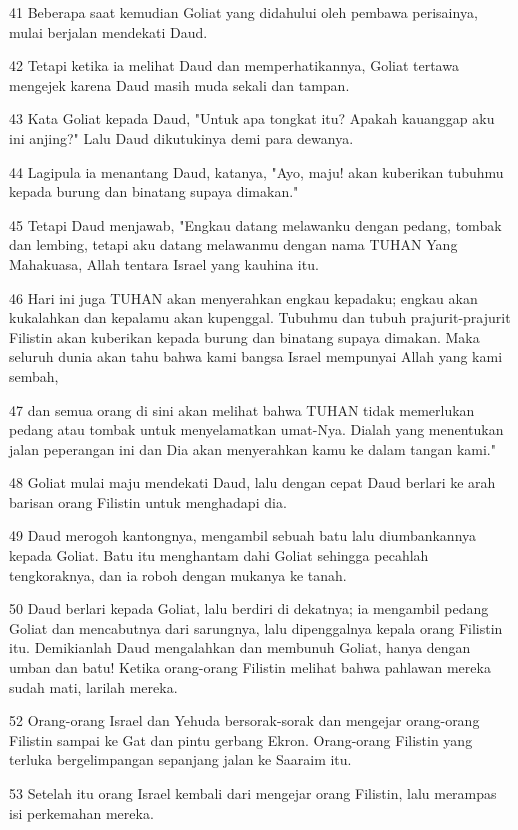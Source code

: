 \par 41 Beberapa saat kemudian Goliat yang didahului oleh pembawa perisainya, mulai berjalan mendekati Daud.
\par 42 Tetapi ketika ia melihat Daud dan memperhatikannya, Goliat tertawa mengejek karena Daud masih muda sekali dan tampan.
\par 43 Kata Goliat kepada Daud, "Untuk apa tongkat itu? Apakah kauanggap aku ini anjing?" Lalu Daud dikutukinya demi para dewanya.
\par 44 Lagipula ia menantang Daud, katanya, "Ayo, maju! akan kuberikan tubuhmu kepada burung dan binatang supaya dimakan."
\par 45 Tetapi Daud menjawab, "Engkau datang melawanku dengan pedang, tombak dan lembing, tetapi aku datang melawanmu dengan nama TUHAN Yang Mahakuasa, Allah tentara Israel yang kauhina itu.
\par 46 Hari ini juga TUHAN akan menyerahkan engkau kepadaku; engkau akan kukalahkan dan kepalamu akan kupenggal. Tubuhmu dan tubuh prajurit-prajurit Filistin akan kuberikan kepada burung dan binatang supaya dimakan. Maka seluruh dunia akan tahu bahwa kami bangsa Israel mempunyai Allah yang kami sembah,
\par 47 dan semua orang di sini akan melihat bahwa TUHAN tidak memerlukan pedang atau tombak untuk menyelamatkan umat-Nya. Dialah yang menentukan jalan peperangan ini dan Dia akan menyerahkan kamu ke dalam tangan kami."
\par 48 Goliat mulai maju mendekati Daud, lalu dengan cepat Daud berlari ke arah barisan orang Filistin untuk menghadapi dia.
\par 49 Daud merogoh kantongnya, mengambil sebuah batu lalu diumbankannya kepada Goliat. Batu itu menghantam dahi Goliat sehingga pecahlah tengkoraknya, dan ia roboh dengan mukanya ke tanah.
\par 50 Daud berlari kepada Goliat, lalu berdiri di dekatnya; ia mengambil pedang Goliat dan mencabutnya dari sarungnya, lalu dipenggalnya kepala orang Filistin itu. Demikianlah Daud mengalahkan dan membunuh Goliat, hanya dengan umban dan batu! Ketika orang-orang Filistin melihat bahwa pahlawan mereka sudah mati, larilah mereka.
\par 52 Orang-orang Israel dan Yehuda bersorak-sorak dan mengejar orang-orang Filistin sampai ke Gat dan pintu gerbang Ekron. Orang-orang Filistin yang terluka bergelimpangan sepanjang jalan ke Saaraim itu.
\par 53 Setelah itu orang Israel kembali dari mengejar orang Filistin, lalu merampas isi perkemahan mereka.
